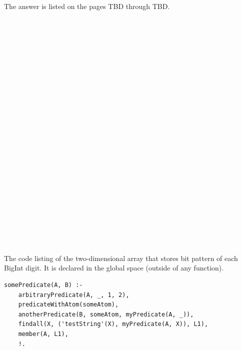 \documentclass{article}
\begin{document}
	The answer is listed on the pages TBD through TBD.
	
	
\paragraph{}\
\paragraph{}\
\paragraph{}\
\paragraph{}\
\paragraph{}\
\paragraph{}\
\paragraph{}\
\paragraph{}\
\paragraph{}\
\paragraph{}\
\paragraph{}\
\paragraph{}\

	
	\noindent The code listing of the two-dimensional array that stores bit pattern of each BigInt digit. It is declared in the global space (outside of any function).
	
	\begin{verbatim}
somePredicate(A, B) :-
    arbitraryPredicate(A, _, 1, 2),
    predicateWithAtom(someAtom),
    anotherPredicate(B, someAtom, myPredicate(A, _)),
    findall(X, ('testString'(X), myPredicate(A, X)), L1),
    member(A, L1),
    !.
	\end{verbatim}
	
\end{document}
